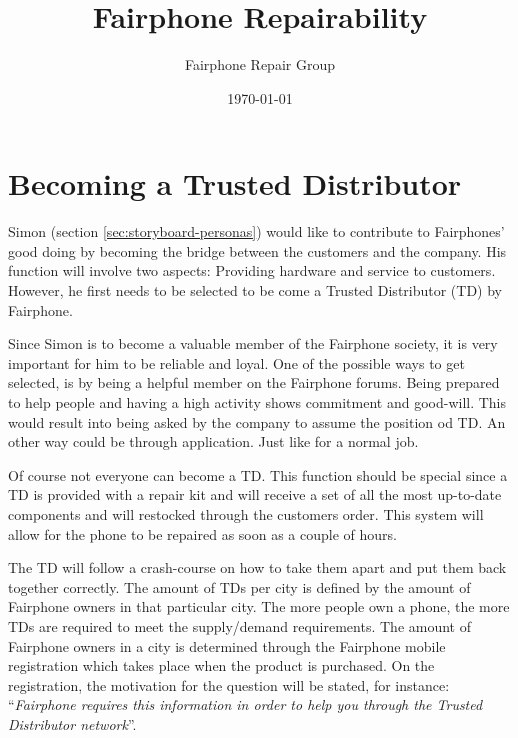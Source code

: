 \documentclass[final,a4paper]{report} %
\author{Fairphone Repair Group}
\title{Fairphone Repairability}
\date{\today}
\begin{document}
	\section{Becoming a Trusted Distributor}
	\label{sec:becoming-td}
	Simon (section \ref{sec:storyboard-personas}) would like to contribute to Fairphones' good doing by becoming the bridge between the customers and the company. His function will involve two aspects: Providing hardware and service to customers. However, he first needs to be selected to be come a Trusted Distributor (TD) by Fairphone.
	
	Since Simon is to become a valuable member of the Fairphone society, it is very important for him to be reliable and loyal. One of the possible ways to get selected, is by being a helpful member on the Fairphone forums. Being prepared to help people and having a high activity shows commitment and good-will. This would result into being asked by the company to assume the position od TD. An other way could be through application. Just like for a normal job. 
	
	Of course not everyone can become a TD. This function should be special since a TD is provided with a repair kit and will receive a set of all the most up-to-date components and will restocked through the customers order. This system will allow for the phone to be repaired as soon as a couple of hours. 
	
	The TD will follow a crash-course on how to take them apart and put them back together correctly. The amount of TDs per city is defined by the amount of Fairphone owners in that particular city. The more people own a phone, the more TDs are required to meet the supply/demand requirements. The amount of Fairphone owners in a city is determined through the Fairphone mobile registration which takes place when the product is purchased. On the registration, the motivation for the question will be stated, for instance: ``\textit{Fairphone requires this information in order to help you through the Trusted Distributor network}''.
\end{document}
